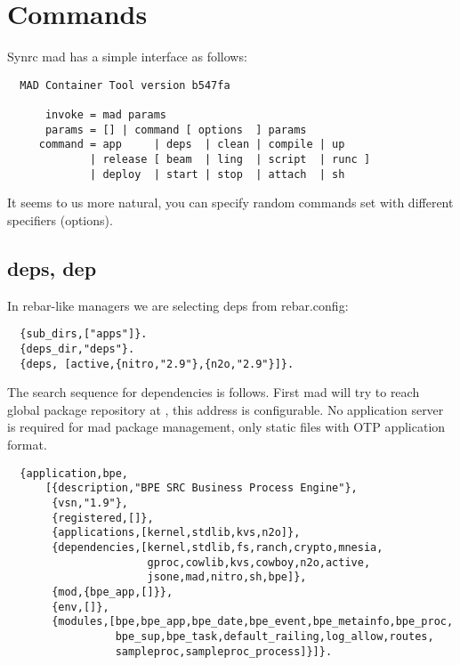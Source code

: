 \section{Commands}

Synrc mad has a simple interface as follows:

\vspace{1\baselineskip}
\begin{lstlisting}
  MAD Container Tool version b547fa

      invoke = mad params
      params = [] | command [ options  ] params
     command = app     | deps  | clean | compile | up
             | release [ beam  | ling  | script  | runc ]
             | deploy  | start | stop  | attach  | sh
\end{lstlisting}
\vspace{1\baselineskip}

It seems to us more natural, you can specify random
commands set with different specifiers (options).

\subsection{deps, dep}

In rebar-like managers we are selecting deps from rebar.config:
\vspace{1\baselineskip}
\begin{lstlisting}
  {sub_dirs,["apps"]}.
  {deps_dir,"deps"}.
  {deps, [active,{nitro,"2.9"},{n2o,"2.9"}]}.
\end{lstlisting}
\vspace{1\baselineskip}

The search sequence for dependencies is follows. First mad will try to
reach global package repository at ,
this address is configurable. No application server is required for mad
package management, only static files with OTP application format.

\vspace{1\baselineskip}
\begin{lstlisting}
  {application,bpe,
      [{description,"BPE SRC Business Process Engine"},
       {vsn,"1.9"},
       {registered,[]},
       {applications,[kernel,stdlib,kvs,n2o]},
       {dependencies,[kernel,stdlib,fs,ranch,crypto,mnesia,
                      gproc,cowlib,kvs,cowboy,n2o,active,
                      jsone,mad,nitro,sh,bpe]},
       {mod,{bpe_app,[]}},
       {env,[]},
       {modules,[bpe,bpe_app,bpe_date,bpe_event,bpe_metainfo,bpe_proc,
                 bpe_sup,bpe_task,default_railing,log_allow,routes,
                 sampleproc,sampleproc_process]}]}.
\end{lstlisting}
\vspace{1\baselineskip}

